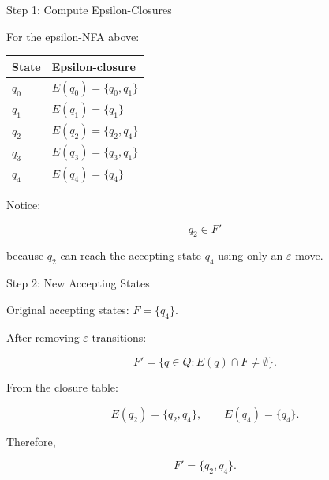 \documentclass[10pt,aspectratio=169]{beamer}
\newcommand{\eps}{\varepsilon}
\begin{document}
\begin{frame}{Step 1: Compute Epsilon-Closures}

For the epsilon-NFA above:

\vspace{0.5em}

\begin{center}
\begin{tabular}{l|l}
\toprule
\textbf{State} & \textbf{Epsilon-closure}\\
\midrule
$q_0$ & $E(q_0)=\{q_0,q_1\}$\\
$q_1$ & $E(q_1)=\{q_1\}$\\
$q_2$ & $E(q_2)=\{q_2,q_4\}$\\
$q_3$ & $E(q_3)=\{q_3,q_1\}$\\
$q_4$ & $E(q_4)=\{q_4\}$\\
\bottomrule
\end{tabular}
\end{center}

\vspace{0.8em}

Notice:

\[
q_2\in F'
\]

because \(q_2\) can reach the accepting state \(q_4\) using only an \(\eps\)-move.

\end{frame}

\begin{frame}{Step 2: New Accepting States}

Original accepting states: \(
F=\{q_4\}.
\)

\vspace{0.8em}

After removing \(\eps\)-transitions:

\[
F'=\{q\in Q:E(q)\cap F\neq\emptyset\}.
\]

\vspace{0.8em}

From the closure table:

\[
E(q_2)=\{q_2,q_4\},
\qquad
E(q_4)=\{q_4\}.
\]

Therefore,

\[
F'=\{q_2,q_4\}.
\]

\end{frame}
\end{document}
